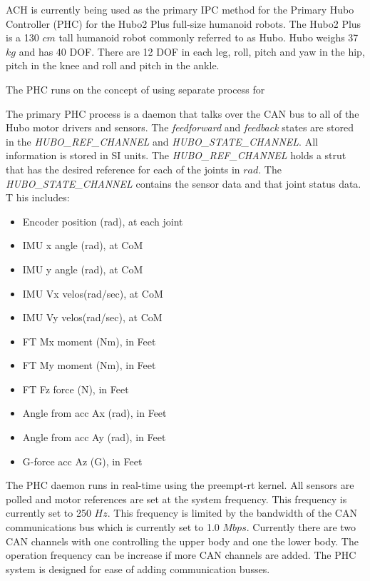 ACH is currently being used as the primary IPC method for the Primary Hubo Controller (PHC) for the Hubo2 Plus full-size humanoid robots.  
The Hubo2 Plus is a 130 $cm$ tall humanoid robot commonly referred to as Hubo.  
Hubo weighs 37 $kg$ and has 40 DOF.  
There are 12 DOF in each leg, roll, pitch and yaw in the hip, pitch in the knee and roll and pitch in the ankle.  

The PHC runs on the concept of using separate process for 

The primary PHC process is a daemon that talks over the CAN bus to all of the Hubo motor drivers and sensors.  
The \textit{feedforward} and \textit{feedback} states are stored in the \textit{HUBO\_REF\_CHANNEL} and \textit{HUBO\_STATE\_CHANNEL}.  
All information is stored in SI units.  The \textit{HUBO\_REF\_CHANNEL} holds a strut that has the desired reference for each of the joints in $rad$.  
The \textit{HUBO\_STATE\_CHANNEL} contains the sensor data and that joint status data.  T
his includes:

\begin{itemize}
                \item Encoder position (rad), at each joint
                \item IMU x angle (rad), at CoM
                \item IMU y angle (rad), at CoM
                \item IMU Vx velos(rad/sec), at CoM
                \item IMU Vy velos(rad/sec), at CoM
                \item FT Mx moment (Nm), in Feet
                \item FT My moment (Nm), in Feet
                \item FT Fz force (N), in Feet
                \item Angle from acc Ax (rad), in Feet
                \item Angle from acc Ay (rad), in Feet
                \item G-force acc Az (G), in Feet
\end{itemize}

The PHC daemon runs in real-time using the preempt-rt kernel.  
All sensors are polled and motor references are set at the system frequency.  
This frequency is currently set to 250 $Hz$.  
This frequency is limited by the bandwidth of the CAN communications bus which is currently set to 1.0 $Mbps$.  
Currently there are two CAN channels with one controlling the upper body and one the lower body.  
The operation frequency can be increase if more CAN channels are added.  
The PHC system is designed for ease of adding communication busses.  

